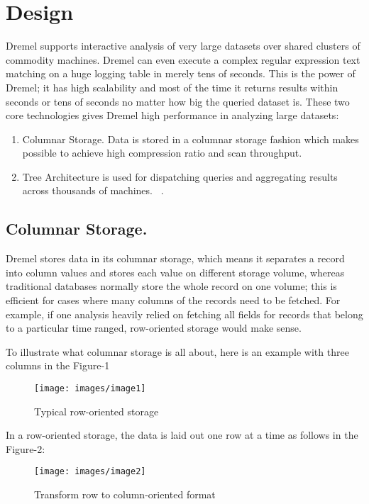 \documentclass[9pt,twocolumn,twoside]{styles/osajnl}
\begin{document}
\section{Design}

Dremel supports interactive analysis of very large datasets over shared clusters of commodity machines.  Dremel can even execute a complex regular expression text matching on a huge logging table in merely tens of seconds. This is the power of Dremel; it has high scalability and most of the time it returns results within seconds or tens of seconds no matter how big the queried dataset is. These two core technologies gives Dremel high performance in analyzing large datasets: 

\begin{enumerate}
  \item 	Columnar Storage. Data is stored in a columnar storage fashion which makes possible to achieve  high compression ratio and scan throughput.
  \item Tree Architecture is used for dispatching queries and aggregating results across thousands of machines. ~\cite{paper-dremel}.
\end{enumerate}

\subsection{Columnar Storage.}
Dremel stores data in its columnar storage, which means it separates a record into column values and stores each value on different storage volume, whereas traditional databases normally store the whole record on one volume; this is efficient for cases where many columns of the records need to be fetched. For example, if one analysis heavily relied on fetching all fields for records that belong to a particular time ranged, row-oriented storage would make sense. 

To illustrate what columnar storage is all about, here is an example with three columns in the Figure-1


\begin{figure}[H]
 \centering
\texttt{[image: images/image1]}
\caption{Typical row-oriented storage}
\end{figure}



In a row-oriented storage, the data is laid out one row at a time as follows in the Figure-2:


\begin{figure}[H]
 \centering
\texttt{[image: images/image2]}
\caption{Transform row to column-oriented format}
\end{figure}
\end{document}
